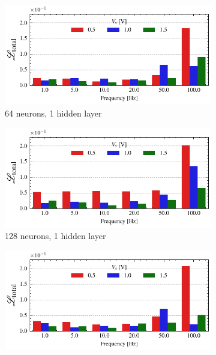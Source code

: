 \documentclass[11pt, oneside]{article}
\begin{document}
\begin{figure}
    \begin{subfigure}[c]{0.48\linewidth}
        \centering
        \includegraphics[width=\linewidth]{sample_results/loss_per_freq_model_silu_64_1best_cpu.pdf}
        \caption{64 neurons, 1 hidden layer}
    \end{subfigure}
    \begin{subfigure}[c]{0.48\linewidth}
        \centering
        \includegraphics[width=\linewidth]{sample_results/loss_per_freq_model_silu_128_1best_cpu.pdf}
        \caption{128 neurons, 1 hidden layer}
    \end{subfigure}
    \begin{subfigure}[c]{0.48\linewidth}
        \centering
        \includegraphics[width=\linewidth]{sample_results/loss_per_freq_model_silu_128_3best_cpu.pdf}

\end{subfigure}
\end{figure}
\end{document}
